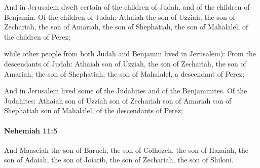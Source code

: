 			\begin{versebox}
					\item[BHS] 
					\item[LXX] 
					\item[ASV] And in Jerusalem dwelt certain of the children of Judah, and of the children of Benjamin. Of the children of Judah: Athaiah the son of Uzziah, the son of Zechariah, the son of Amariah, the son of Shephatiah, the son of Mahalalel, of the children of Perez;
					\item[NIV] while other people from both Judah and Benjamin lived in Jerusalem): From the descendants of Judah: Athaiah son of Uzziah, the son of Zechariah, the son of Amariah, the son of Shephatiah, the son of Mahalalel, a descendant of Perez;
					\item[NRSV] And in Jerusalem lived some of the Judahites and of the Benjaminites. Of the Judahites: Athaiah son of Uzziah son of Zechariah son of Amariah son of Shephatiah son of Mahalalel, of the descendants of Perez;
			\end{versebox}

		\paragraph{Nehemiah 11:5} %
			\label{NEHEMIAH-11-5}

			And Maaseiah the son of Baruch, the son of Colhozeh, the son of Hazaiah, the son of Adaiah, the son of Joiarib, the son of Zechariah, the son of Shiloni.

